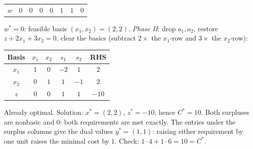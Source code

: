 \begin{solutions}
\begin{center}
\begin{tabular}{c|cccccc|c}
        \hline
        $w$ & $0$ & $0$ & $0$ & $0$ & $1$ & $1$ & $0$\\
        \end{tabular}
        \end{center}
        $w^{*}=0$: feasible basis $(x_{1},x_{2})=(2,2)$. \emph{Phase II}:
        drop $a_{1},a_{2}$, restore $z+2x_{1}+3x_{2}=0$, clear the basics
        (subtract $2\times$ the $x_{1}$-row and $3\times$ the $x_{2}$-row):
        \begin{center}
        \begin{tabular}{c|cccc|c}
        Basis & $x_{1}$ & $x_{2}$ & $s_{1}$ & $s_{2}$ & RHS\\
        \hline
        $x_{1}$ & $1$ & $0$ & $-2$ & $1$ & $2$\\
        $x_{2}$ & $0$ & $1$ & $1$ & $-1$ & $2$\\
        \hline
        $z$ & $0$ & $0$ & $1$ & $1$ & $-10$\\
        \end{tabular}
        \end{center}
        Already optimal. Solution: $x^{*}=(2,2)$, $z^{*}=-10$, hence
        $C^{*}=10$. Both surpluses are nonbasic and $0$: both requirements
        are met exactly. The entries under the surplus columns give the
        dual values $y^{*}=(1,1)$: raising either requirement by one unit
        raises the minimal cost by $1$. Check:
        $1\cdot 4+1\cdot 6=10=C^{*}$.


\end{solutions}
